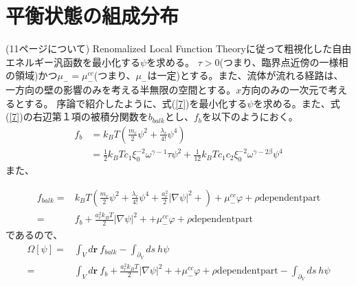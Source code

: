 \documentclass[a4paper,12pt, oneside, openany]{jsbook}
\begin{document}
\section{平衡状態の組成分布}
(11ページについて)
Renomalized Local Function Theoryに従って粗視化した自由エネルギー汎函数を最小化する$\psi$を求める。
$\tau>0$(つまり、臨界点近傍の一様相の領域)かつ$\mu_-=\mu_-^{cc}$(つまり、$\mu_-$は一定)とする。また、流体が流れる経路は、一方向の壁の影響のみを考える半無限の空間とする。$x$方向のみの一次元で考えるとする。
序論で紹介したように、式(\ref{7})を最小化する$\psi$を求める。また、式(\ref{7})の右辺第１項の被積分関数を$b_{balk}$とし、$f_b$を以下のようにおく。
\begin{equation}
\begin{split}
   f_b&=k_BT\left(\frac{m_r}{2}\psi^2+\frac{\lambda_r}{4!}\psi^4\right)\\
&=\frac{1}{2} k_BTc_1\xi_0^{-2}\omega^{\gamma-1}\tau\psi^2+\frac{1}{12}k_BTc_1c_2\xi_0^{-2}\omega^{\gamma-2\beta}\psi^4
\end{split}
\end{equation}
また、

\begin{equation}
\begin{split}
   f_{balk}=&k_BT\left(\frac{m_r}{2}\psi^2+\frac{\lambda_r}{4!}\psi^4+\frac{a_r^2}{2}|\nabla\psi|^2 +\right)+\mu_-^{cc}\varphi+\rho\mathrm{dependentpart}\\
   =&f_b+\frac{a_r^2k_BT}{2}|\nabla\psi|^2 ++\mu_-^{cc}\varphi+\rho \mathrm{dependentpart}
\end{split}
\end{equation}
であるので、
\begin{equation}
  \begin{split}
    \Omega[\psi]=&\int_V d\boldsymbol{r}\ f_{balk}-\int_{\partial_V}ds\ h\psi\\
    =&\int_V d\boldsymbol{r}\ f_b+\frac{a_r^2k_BT}{2}|\nabla\psi|^2 ++\mu_-^{cc}\varphi+\rho \mathrm{dependentpart}-\int_{\partial_V}ds\ h\psi
  \end{split}
\end{equation}
\end{document}
